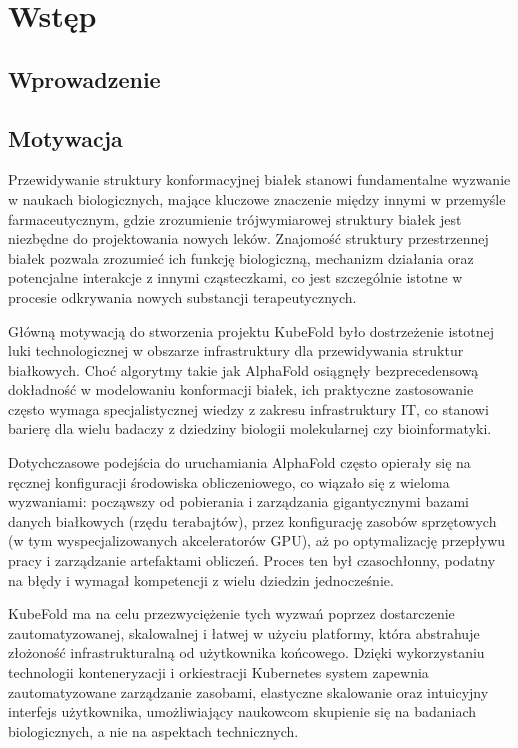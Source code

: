 \chapter{Wstęp}


\section{Wprowadzenie}


\section{Motywacja}

Przewidywanie struktury konformacyjnej białek stanowi fundamentalne wyzwanie w naukach biologicznych, mające kluczowe znaczenie między innymi w przemyśle farmaceutycznym, gdzie zrozumienie trójwymiarowej struktury białek jest niezbędne do projektowania nowych leków.
Znajomość struktury przestrzennej białek pozwala zrozumieć ich funkcję biologiczną, mechanizm działania oraz potencjalne interakcje z innymi cząsteczkami, co jest szczególnie istotne w procesie odkrywania nowych substancji terapeutycznych.

Główną motywacją do stworzenia projektu KubeFold było dostrzeżenie istotnej luki technologicznej w obszarze infrastruktury dla przewidywania struktur białkowych.
Choć algorytmy takie jak AlphaFold osiągnęły bezprecedensową dokładność w modelowaniu konformacji białek, ich praktyczne zastosowanie często wymaga specjalistycznej wiedzy z zakresu infrastruktury IT, co stanowi barierę dla wielu badaczy z dziedziny biologii molekularnej czy bioinformatyki.

Dotychczasowe podejścia do uruchamiania AlphaFold często opierały się na ręcznej konfiguracji środowiska obliczeniowego, co wiązało się z wieloma wyzwaniami: począwszy od pobierania i zarządzania gigantycznymi bazami danych białkowych (rzędu terabajtów), przez konfigurację zasobów sprzętowych (w tym wyspecjalizowanych akceleratorów GPU), aż po optymalizację przepływu pracy i zarządzanie artefaktami obliczeń.
Proces ten był czasochłonny, podatny na błędy i wymagał kompetencji z wielu dziedzin jednocześnie.

KubeFold ma na celu przezwyciężenie tych wyzwań poprzez dostarczenie zautomatyzowanej, skalowalnej i łatwej w użyciu platformy, która abstrahuje złożoność infrastrukturalną od użytkownika końcowego.
Dzięki wykorzystaniu technologii konteneryzacji i orkiestracji Kubernetes system zapewnia zautomatyzowane zarządzanie zasobami, elastyczne skalowanie oraz intuicyjny interfejs użytkownika, umożliwiający naukowcom skupienie się na badaniach biologicznych, a nie na aspektach technicznych.


